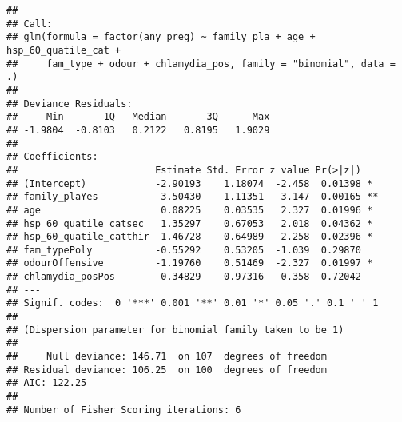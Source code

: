 \documentclass[
]{article}
\begin{document}
\begin{verbatim}
## 
## Call:
## glm(formula = factor(any_preg) ~ family_pla + age + hsp_60_quatile_cat + 
##     fam_type + odour + chlamydia_pos, family = "binomial", data = .)
## 
## Deviance Residuals: 
##     Min       1Q   Median       3Q      Max  
## -1.9804  -0.8103   0.2122   0.8195   1.9029  
## 
## Coefficients:
##                        Estimate Std. Error z value Pr(>|z|)   
## (Intercept)            -2.90193    1.18074  -2.458  0.01398 * 
## family_plaYes           3.50430    1.11351   3.147  0.00165 **
## age                     0.08225    0.03535   2.327  0.01996 * 
## hsp_60_quatile_catsec   1.35297    0.67053   2.018  0.04362 * 
## hsp_60_quatile_catthir  1.46728    0.64989   2.258  0.02396 * 
## fam_typePoly           -0.55292    0.53205  -1.039  0.29870   
## odourOffensive         -1.19760    0.51469  -2.327  0.01997 * 
## chlamydia_posPos        0.34829    0.97316   0.358  0.72042   
## ---
## Signif. codes:  0 '***' 0.001 '**' 0.01 '*' 0.05 '.' 0.1 ' ' 1
## 
## (Dispersion parameter for binomial family taken to be 1)
## 
##     Null deviance: 146.71  on 107  degrees of freedom
## Residual deviance: 106.25  on 100  degrees of freedom
## AIC: 122.25
## 
## Number of Fisher Scoring iterations: 6
\end{verbatim}
\end{document}
